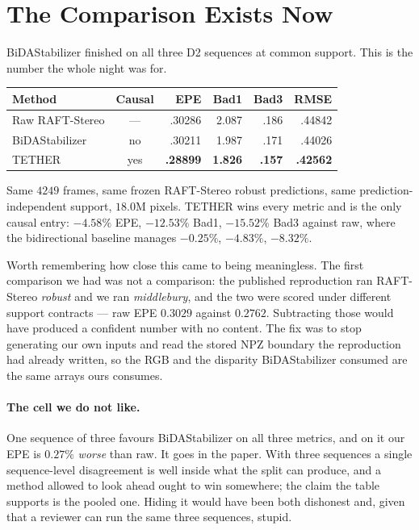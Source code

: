\documentclass[11pt,a4paper]{article}
\begin{document}
\section*{The Comparison Exists Now}

BiDAStabilizer finished on all three D2 sequences at common support. This
is the number the whole night was for.

\begin{center}
\footnotesize
\begin{tabular}{@{}lcrrrr@{}}
\toprule
Method & Causal & EPE & Bad1 & Bad3 & RMSE \\
\midrule
Raw RAFT-Stereo & --- & .30286 & 2.087 & .186 & .44842 \\
BiDAStabilizer  & no  & .30211 & 1.987 & .171 & .44026 \\
TETHER          & yes & \textbf{.28899} & \textbf{1.826} & \textbf{.157} & \textbf{.42562} \\
\bottomrule
\end{tabular}
\end{center}

Same $4249$ frames, same frozen RAFT-Stereo robust predictions, same
prediction-independent support, $18.0$M pixels. TETHER wins every metric
and is the only causal entry: $-4.58\%$ EPE, $-12.53\%$ Bad1, $-15.52\%$
Bad3 against raw, where the bidirectional baseline manages $-0.25\%$,
$-4.83\%$, $-8.32\%$.

Worth remembering how close this came to being meaningless. The first
comparison we had was not a comparison: the published reproduction ran
RAFT-Stereo \emph{robust} and we ran \emph{middlebury}, and the two were
scored under different support contracts --- raw EPE $0.3029$ against
$0.2762$. Subtracting those would have produced a confident number with
no content. The fix was to stop generating our own inputs and read the
stored NPZ boundary the reproduction had already written, so the RGB and
the disparity BiDAStabilizer consumed are the same arrays ours consumes.

\paragraph{The cell we do not like.} One sequence of three favours
BiDAStabilizer on all three metrics, and on it our EPE is $0.27\%$
\emph{worse} than raw. It goes in the paper. With three sequences a
single sequence-level disagreement is well inside what the split can
produce, and a method allowed to look ahead ought to win somewhere; the
claim the table supports is the pooled one. Hiding it would have been
both dishonest and, given that a reviewer can run the same three
sequences, stupid.
\end{document}
